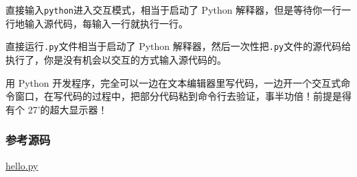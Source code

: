 直接输入\texttt{python}进入交互模式，相当于启动了 Python
解释器，但是等待你一行一行地输入源代码，每输入一行就执行一行。

直接运行\texttt{.py}文件相当于启动了 Python
解释器，然后一次性把\texttt{.py}文件的源代码给执行了，你是没有机会以交互的方式输入源代码的。

用 Python
开发程序，完全可以一边在文本编辑器里写代码，一边开一个交互式命令窗口，在写代码的过程中，把部分代码粘到命令行去验证，事半功倍！前提是得有个
27'的超大显示器！

\hypertarget{ux53c2ux8003ux6e90ux7801}{%
\subsubsection{参考源码}\label{ux53c2ux8003ux6e90ux7801}}

\href{https://github.com/michaelliao/learn-python3/blob/master/samples/basic/hello.py}{hello.py}

